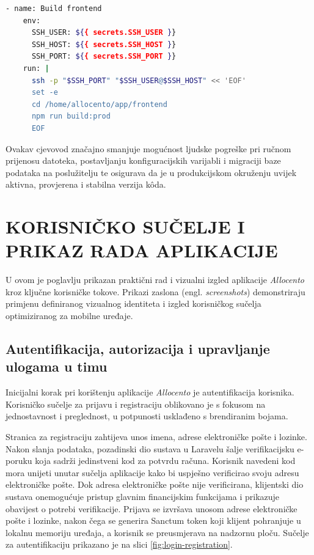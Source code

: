 \documentclass[a4paper,12pt,oneside]{article}
\begin{document}
	\begin{lstlisting}[language=bash, caption={Isječak koda CI/CD cjevovoda za izgradnju Angular aplikacije}, label={lst:github_actions}]
  - name: Build frontend
    env:
      SSH_USER: ${{ secrets.SSH_USER }}
      SSH_HOST: ${{ secrets.SSH_HOST }}
      SSH_PORT: ${{ secrets.SSH_PORT }}
    run: |
      ssh -p "$SSH_PORT" "$SSH_USER@$SSH_HOST" << 'EOF'
      set -e
      cd /home/allocento/app/frontend
      npm run build:prod
      EOF
	\end{lstlisting}

	Ovakav cjevovod značajno smanjuje mogućnost ljudske pogreške pri ručnom prijenosu datoteka, postavljanju konfiguracijskih varijabli i migraciji baze podataka na poslužitelju te osigurava da je u produkcijskom okruženju uvijek aktivna, provjerena i stabilna verzija kôda.
	
	\newpage
	\section{KORISNIČKO SUČELJE I PRIKAZ RADA APLIKACIJE}
	
	U ovom je poglavlju prikazan praktični rad i vizualni izgled aplikacije \textit{Allocento} kroz ključne korisničke tokove. Prikazi zaslona (engl. \textit{screenshots}) demonstriraju primjenu definiranog vizualnog identiteta i izgled korisničkog sučelja optimiziranog za mobilne uređaje.
	
	\subsection{Autentifikacija, autorizacija i upravljanje ulogama u timu}
	
	Inicijalni korak pri korištenju aplikacije \textit{Allocento} je autentifikacija korisnika. Korisničko sučelje za prijavu i registraciju oblikovano je s fokusom na jednostavnost i preglednost, u potpunosti usklađeno s brendiranim bojama.
	
	Stranica za registraciju zahtijeva unos imena, adrese elektroničke pošte i lozinke. Nakon slanja podataka, pozadinski dio sustava u Laravelu šalje verifikacijsku e-poruku koja sadrži jedinstveni kod za potvrdu računa. Korisnik navedeni kod mora unijeti unutar sučelja aplikacije kako bi uspješno verificirao svoju adresu elektroničke pošte. Dok adresa elektroničke pošte nije verificirana, klijentski dio sustava onemogućuje pristup glavnim financijskim funkcijama i prikazuje obavijest o potrebi verifikacije. Prijava se izvršava unosom adrese elektroničke pošte i lozinke, nakon čega se generira Sanctum token koji klijent pohranjuje u lokalnu memoriju uređaja, a korisnik se preusmjerava na nadzornu ploču. Sučelje za autentifikaciju prikazano je na slici \ref{fig:login-registration}.
\end{document}
